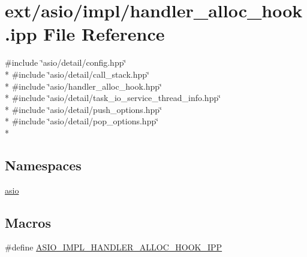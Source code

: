 \hypertarget{handler__alloc__hook_8ipp}{}\section{ext/asio/impl/handler\+\_\+alloc\+\_\+hook.ipp File Reference}
\label{handler__alloc__hook_8ipp}
{\ttfamily \#include \char`\"{}asio/detail/config.\+hpp\char`\"{}}\\*
{\ttfamily \#include \char`\"{}asio/detail/call\+\_\+stack.\+hpp\char`\"{}}\\*
{\ttfamily \#include \char`\"{}asio/handler\+\_\+alloc\+\_\+hook.\+hpp\char`\"{}}\\*
{\ttfamily \#include \char`\"{}asio/detail/task\+\_\+io\+\_\+service\+\_\+thread\+\_\+info.\+hpp\char`\"{}}\\*
{\ttfamily \#include \char`\"{}asio/detail/push\+\_\+options.\+hpp\char`\"{}}\\*
{\ttfamily \#include \char`\"{}asio/detail/pop\+\_\+options.\+hpp\char`\"{}}\\*
\subsection*{Namespaces}
\begin{DoxyCompactItemize}
\item 
 \hyperlink{namespaceasio}{asio}
\end{DoxyCompactItemize}
\subsection*{Macros}
\begin{DoxyCompactItemize}
\item 
\#define \hyperlink{handler__alloc__hook_8ipp_a4be3234a83a649e6a315f64e0d25ba3d}{A\+S\+I\+O\+\_\+\+I\+M\+P\+L\+\_\+\+H\+A\+N\+D\+L\+E\+R\+\_\+\+A\+L\+L\+O\+C\+\_\+\+H\+O\+O\+K\+\_\+\+I\+P\+P}
\end{DoxyCompactItemize}
